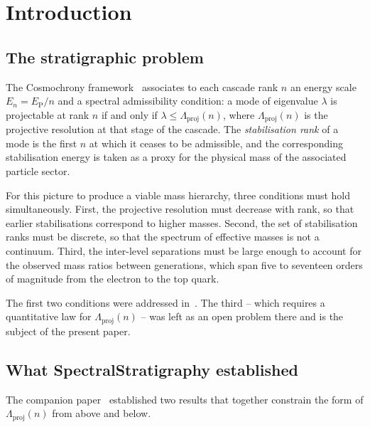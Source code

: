 \documentclass[12pt, a4paper]{article}
\theoremstyle{plain}
\theoremstyle{definition}
\theoremstyle{remark}
\begin{document}
  \clearpage
  \tableofcontents
  \newpage

  \clearpage
  \section{Introduction}
    \label{sec:intro}

    \subsection{The stratigraphic problem}
      \label{sec:intro:problem}

      The Cosmochrony framework~\cite{Cosmochrony} associates to each
      cascade rank $n$ an energy scale $E_n = E_{\mathrm{P}}/n$ and a spectral
      admissibility condition: a mode of eigenvalue $\lambda$ is projectable at rank
      $n$ if and only if $\lambda \leq \Lambda_{\mathrm{proj}}(n)$, where
      $\Lambda_{\mathrm{proj}}(n)$ is the projective resolution at that stage of the
      cascade.
      The \emph{stabilisation rank} of a mode is the first $n$ at which it ceases
      to be admissible, and the corresponding stabilisation energy is taken as a
      proxy for the physical mass of the associated particle sector.

      For this picture to produce a viable mass hierarchy, three conditions must hold
      simultaneously.
      First, the projective resolution must decrease with rank, so that earlier
      stabilisations correspond to higher masses.
      Second, the set of stabilisation ranks must be discrete, so that the spectrum
      of effective masses is not a continuum.
      Third, the inter-level separations must be large enough to account for the
      observed mass ratios between generations, which span five to seventeen orders
      of magnitude from the electron to the top quark.

      The first two conditions were addressed in~\cite{Beau2026a4}.
      The third -- which requires a quantitative law for $\Lambda_{\mathrm{proj}}(n)$
      -- was left as an open problem there and is the subject of the present paper.

    \subsection{What SpectralStratigraphy established}
      \label{sec:intro:stratigraphy}

      The companion paper~\cite{Beau2026a4} established two results that
      together constrain the form of $\Lambda_{\mathrm{proj}}(n)$ from above and
      below.
\end{document}
